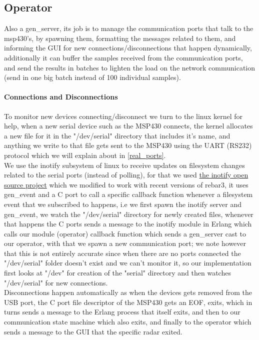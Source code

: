 \documentclass{article}
\begin{document}
\subsection{Operator}
Also a gen\_server, its job is to manage the communication ports that talk to the msp430's, by spawning them, formatting the messages related to them, and informing the GUI for new connections/disconnections that happen dynamically, additionally it can buffer the samples received from the communication ports, and send the results in batches to lighten the load on the network communication (send in one big batch instead of 100 individual samples).

\paragraph{Connections and Disconnections}
To monitor new devices connecting/disconnect we turn to the linux kernel for help, when a new serial device such as the MSP430 connects, the kernel allocates a new file for it in the "/dev/serial" directory that includes it's name, and anything we write to that file gets sent to the MSP430 using the UART (RS232) protocol which we will explain about in \ref{real_ports}.\\
We use the inotify subsystem of linux to receive updates on filesystem changes related to the serial ports (instead of polling), for that we used \href{https://github.com/EliasA5/inotify}{the inotify open source project} which we modified to work with recent versions of rebar3, it uses gen\_event and a C port to call a specific callback function whenever a filesystem event that we subscribed to happens, i.e we first spawn the inotify server and gen\_event, we watch the "/dev/serial" directory for newly created files, whenever that happens the C ports sends a message to the inotify module in Erlang which calls our module (operator) callback function which sends a gen\_server cast to our operator, with that we spawn a new communication port; we note however that this is not entirely accurate since when there are no ports connected the "/dev/serial" folder doesn't exist and we can't monitor it, so our implementation first looks at "/dev" for creation of the "serial" directory and then watches "/dev/serial" for new connections.\\
Disconnections happen automatically as when the devices gets removed from the USB port, the C port file descriptor of the MSP430 gets an EOF, exits, which in turns sends a message to the Erlang process that itself exits, and then to our communication state machine which also exits, and finally to the operator which sends a message to the GUI that the specific radar exited.\\
\end{document}
